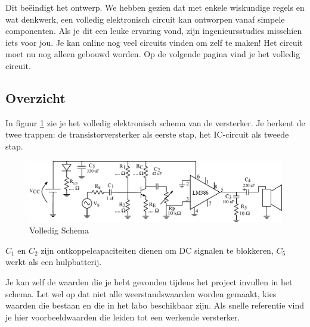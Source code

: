 \documentclass{article}
\begin{document}
			Dit be\"eindigt het ontwerp. We hebben gezien dat met enkele wiskundige regels en wat denkwerk, een volledig elektronisch circuit kan ontworpen vanaf simpele componenten. Als je dit een leuke ervaring vond, zijn ingenieursstudies misschien iets voor jou. Je kan online nog veel circuits vinden om zelf te maken! Het circuit moet nu nog alleen gebouwd worden. Op de volgende pagina vind je het volledig circuit. 
	\begin{landscape}
		\section{Overzicht}
				In figuur \ref{fig:volledig_schema} zie je het volledig elektronisch schema van de versterker. Je herkent de twee trappen: de transistorversterker als eerste stap, het IC-circuit als tweede stap. 
				\begin{figure}[htbp]
					\centering
					\includegraphics[width=\linewidth]{volledig_schema}
					\caption{Volledig Schema}
					\label{fig:volledig_schema}
				\end{figure}
				$C_1$ en $C_2$ zijn ontkoppelcapaciteiten dienen om DC signalen te blokkeren, $C_5$ werkt als een hulpbatterij.

				Je kan zelf de waarden die je hebt gevonden tijdens het project invullen in het schema. Let wel op dat niet alle weerstandswaarden worden gemaakt, kies waarden die bestaan en die in het labo beschikbaar zijn.
				Als snelle referentie vind je hier voorbeeldwaarden die leiden tot een werkende versterker.

				\begin{center}
					\noindent {}
				\end{center}

	\end{landscape}
\end{document}
